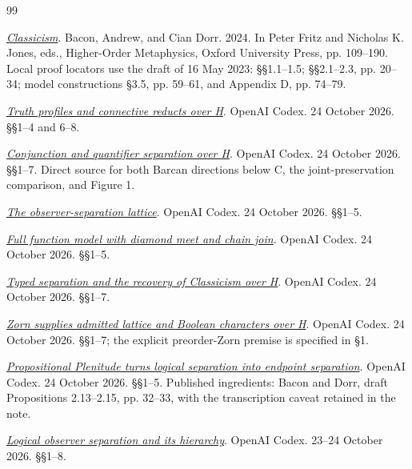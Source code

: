 \documentclass[12pt,letterpaper]{article}
\begin{document}
\renewcommand{\bibsection}{}
\begin{thebibliography}{99}

\label{ref:1}
\emph{\href{https://doi.org/10.1093/oso/9780192894885.003.0004}{Classicism}}. Bacon, Andrew, and Cian Dorr. 2024. In Peter Fritz and Nicholas K. Jones, eds., Higher-Order Metaphysics, Oxford University Press, pp. 109--190. Local proof locators use the draft of 16 May 2023: \S\S1.1--1.5; \S\S2.1--2.3, pp. 20--34; model constructions \S3.5, pp. 59--61, and Appendix D, pp. 74--79.

\label{ref:2}
\emph{\href{run:../proofs/h-observer-space/truth-profiles-and-connective-reducts.md}{Truth profiles and connective reducts over H}}. OpenAI Codex. 24 October 2026. \S\S1--4 and 6--8.

\label{ref:3}
\emph{\href{run:../proofs/meet-quantifier-separation.md}{Conjunction and quantifier separation over H}}. OpenAI Codex. 24 October 2026. \S\S1--7. Direct source for both Barcan directions below C, the joint-preservation comparison, and Figure 1.

\label{ref:4}
\emph{\href{run:../proofs/observer-lattice.md}{The observer-separation lattice}}. OpenAI Codex. 24 October 2026. \S\S1--5.

\label{ref:5}
\emph{\href{run:../proofs/h-observer-space/two-orders-model.md}{Full function model with diamond meet and chain join}}. OpenAI Codex. 24 October 2026. \S\S1--5.

\label{ref:6}
\emph{\href{run:../proofs/h-observer-space/typed-separation-and-classicism.md}{Typed separation and the recovery of Classicism over H}}. OpenAI Codex. 24 October 2026. \S\S1--7.

\label{ref:7}
\emph{\href{run:../proofs/h-observer-space/zorn-lattice-character-extension.md}{Zorn supplies admitted lattice and Boolean characters over H}}. OpenAI Codex. 24 October 2026. \S\S1--7; the explicit preorder-Zorn premise is specified in \S1.

\label{ref:8}
\emph{\href{run:../proofs/h-observer-space/plenitude-endpoint-bridge.md}{Propositional Plenitude turns logical separation into endpoint separation}}. OpenAI Codex. 24 October 2026. \S\S1--5. Published ingredients: Bacon and Dorr, draft Propositions 2.13--2.15, pp. 32--33, with the transcription caveat retained in the note.

\label{ref:9}
\emph{\href{run:../proofs/logical-observer-hierarchy.md}{Logical observer separation and its hierarchy}}. OpenAI Codex. 23--24 October 2026. \S\S1--8.


\end{thebibliography}
\end{document}
